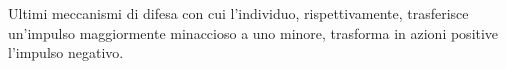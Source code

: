 \documentclass{subfiles}
\begin{document}
Ultimi meccanismi di difesa con cui l'individuo, rispettivamente, trasferisce un'impulso maggiormente minaccioso a uno minore,
trasforma in azioni positive l'impulso negativo.
\end{document}
